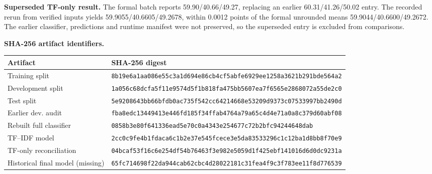 \documentclass[10pt,twocolumn,letterpaper]{article}
\begin{document}
\textbf{Superseded TF-only result.} The formal batch reports 59.90/40.66/49.27, replacing an earlier 60.31/41.26/50.02 entry. The recorded rerun from verified inputs yields 59.9055/40.6605/49.2678, within 0.0012 points of the formal unrounded means 59.9044/40.6600/49.2672. The earlier classifier, predictions and runtime manifest were not preserved, so the superseded entry is excluded from comparisons.

\par\smallskip\noindent\begin{minipage}{\columnwidth}
\textbf{SHA-256 artifact identifiers.}\par\smallskip
\footnotesize
\begin{tabularx}{\columnwidth}{@{}>{\raggedright\arraybackslash}p{}>{\raggedright\arraybackslash}X@{}}
\toprule
\textbf{Artifact} & \textbf{SHA-256 digest} \\
\midrule
Training split & {\scriptsize\texttt{8b19e6a1\allowbreak aa086e55\allowbreak c3a1d694\allowbreak e86cb4cf\allowbreak 5abfe692\allowbreak 9ee1258a\allowbreak 3621b291\allowbreak bde564a2}} \\
Development split & {\scriptsize\texttt{1a056c68\allowbreak dcfa5f11\allowbreak e9574d5f\allowbreak 1b818fa4\allowbreak 75bb5607\allowbreak ea7f6565\allowbreak e2868072\allowbreak a55de2c0}} \\
Test split & {\scriptsize\texttt{5e920864\allowbreak 3bb66bfd\allowbreak b0ac735f\allowbreak 542cc642\allowbreak 14668e53\allowbreak 209d9373\allowbreak c0753399\allowbreak 7bb2490d}} \\
Earlier dev. audit & {\scriptsize\texttt{fba8edc1\allowbreak 3449413e\allowbreak 446fd185\allowbreak f34ffab4\allowbreak 764a79a6\allowbreak 5c4d4e71\allowbreak a0a8c379\allowbreak d60abf08}} \\
Rebuilt full classifier & {\scriptsize\texttt{0858b3e8\allowbreak 0f641336\allowbreak ead5e70c\allowbreak 0a4343e2\allowbreak 54677c72\allowbreak b2bfc942\allowbreak 71705647\allowbreak 44648dab}} \\
TF--IDF model & {\scriptsize\texttt{2cc0c9fe\allowbreak 4b1fdaca\allowbreak 6c1b2e37\allowbreak e545fcec\allowbreak e3e5da83\allowbreak 533296c1\allowbreak c12ba1d8\allowbreak bb8f70e9}} \\
TF-only reconciliation & {\scriptsize\texttt{04bcaf53\allowbreak f16c6e25\allowbreak 4df54b76\allowbreak 463f3e98\allowbreak 2e5059d1\allowbreak f425ebf1\allowbreak 41016d6d\allowbreak 0dc9231a}} \\
Historical final model (missing) & {\scriptsize\texttt{65fc7146\allowbreak 98f22da9\allowbreak 44cab62c\allowbreak bc4d2802\allowbreak 2181c31f\allowbreak ea4f9c3f\allowbreak 783ee11f\allowbreak 8d776539}} \\

\end{tabularx}
\end{minipage}
\end{document}

